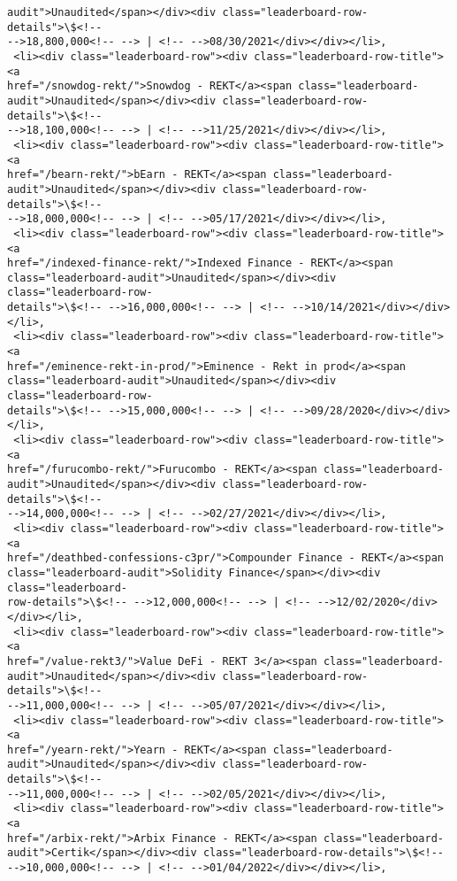 \documentclass[11pt]{article}
\begin{document}
\begin{tcolorbox}[breakable, size=fbox, boxrule=.5pt, pad at break*=1mm, opacityfill=0]
\begin{Verbatim}[commandchars=\\\{\}]
audit">Unaudited</span></div><div class="leaderboard-row-details">\$<!--
-->18,800,000<!-- --> | <!-- -->08/30/2021</div></div></li>,
 <li><div class="leaderboard-row"><div class="leaderboard-row-title"><a
href="/snowdog-rekt/">Snowdog - REKT</a><span class="leaderboard-
audit">Unaudited</span></div><div class="leaderboard-row-details">\$<!--
-->18,100,000<!-- --> | <!-- -->11/25/2021</div></div></li>,
 <li><div class="leaderboard-row"><div class="leaderboard-row-title"><a
href="/bearn-rekt/">bEarn - REKT</a><span class="leaderboard-
audit">Unaudited</span></div><div class="leaderboard-row-details">\$<!--
-->18,000,000<!-- --> | <!-- -->05/17/2021</div></div></li>,
 <li><div class="leaderboard-row"><div class="leaderboard-row-title"><a
href="/indexed-finance-rekt/">Indexed Finance - REKT</a><span
class="leaderboard-audit">Unaudited</span></div><div class="leaderboard-row-
details">\$<!-- -->16,000,000<!-- --> | <!-- -->10/14/2021</div></div></li>,
 <li><div class="leaderboard-row"><div class="leaderboard-row-title"><a
href="/eminence-rekt-in-prod/">Eminence - Rekt in prod</a><span
class="leaderboard-audit">Unaudited</span></div><div class="leaderboard-row-
details">\$<!-- -->15,000,000<!-- --> | <!-- -->09/28/2020</div></div></li>,
 <li><div class="leaderboard-row"><div class="leaderboard-row-title"><a
href="/furucombo-rekt/">Furucombo - REKT</a><span class="leaderboard-
audit">Unaudited</span></div><div class="leaderboard-row-details">\$<!--
-->14,000,000<!-- --> | <!-- -->02/27/2021</div></div></li>,
 <li><div class="leaderboard-row"><div class="leaderboard-row-title"><a
href="/deathbed-confessions-c3pr/">Compounder Finance - REKT</a><span
class="leaderboard-audit">Solidity Finance</span></div><div class="leaderboard-
row-details">\$<!-- -->12,000,000<!-- --> | <!-- -->12/02/2020</div></div></li>,
 <li><div class="leaderboard-row"><div class="leaderboard-row-title"><a
href="/value-rekt3/">Value DeFi - REKT 3</a><span class="leaderboard-
audit">Unaudited</span></div><div class="leaderboard-row-details">\$<!--
-->11,000,000<!-- --> | <!-- -->05/07/2021</div></div></li>,
 <li><div class="leaderboard-row"><div class="leaderboard-row-title"><a
href="/yearn-rekt/">Yearn - REKT</a><span class="leaderboard-
audit">Unaudited</span></div><div class="leaderboard-row-details">\$<!--
-->11,000,000<!-- --> | <!-- -->02/05/2021</div></div></li>,
 <li><div class="leaderboard-row"><div class="leaderboard-row-title"><a
href="/arbix-rekt/">Arbix Finance - REKT</a><span class="leaderboard-
audit">Certik</span></div><div class="leaderboard-row-details">\$<!--
-->10,000,000<!-- --> | <!-- -->01/04/2022</div></div></li>,

\end{Verbatim}
\end{tcolorbox}
\end{document}
